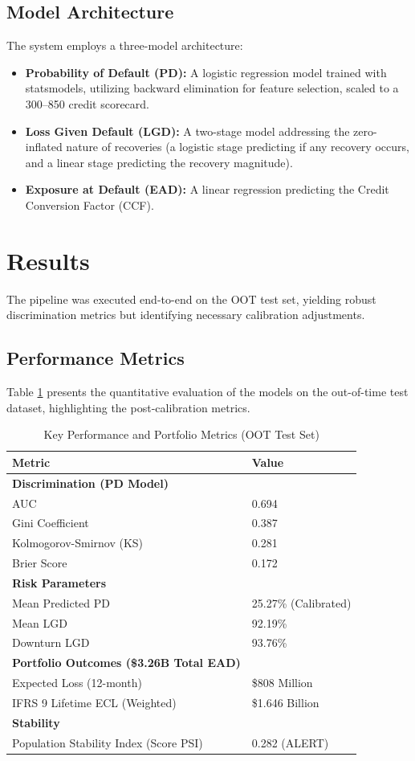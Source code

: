 \documentclass[12pt,a4paper]{article}
\begin{document}
\subsection{Model Architecture}
The system employs a three-model architecture:
\begin{itemize}
    \item \textbf{Probability of Default (PD):} A logistic regression model trained with statsmodels, utilizing backward elimination for feature selection, scaled to a 300--850 credit scorecard.
    \item \textbf{Loss Given Default (LGD):} A two-stage model addressing the zero-inflated nature of recoveries (a logistic stage predicting if any recovery occurs, and a linear stage predicting the recovery magnitude).
    \item \textbf{Exposure at Default (EAD):} A linear regression predicting the Credit Conversion Factor (CCF).
\end{itemize}

\section{Results}
The pipeline was executed end-to-end on the OOT test set, yielding robust discrimination metrics but identifying necessary calibration adjustments. 

\subsection{Performance Metrics}
Table \ref{tab:results} presents the quantitative evaluation of the models on the out-of-time test dataset, highlighting the post-calibration metrics.

\begin{table}[H]
\centering
\caption{Key Performance and Portfolio Metrics (OOT Test Set)}
\label{tab:results}
\begin{tabular}{@{}ll@{}}
\toprule
\textbf{Metric} & \textbf{Value} \\ \midrule
\textbf{Discrimination (PD Model)} & \\
AUC & 0.694 \\
Gini Coefficient & 0.387 \\
Kolmogorov-Smirnov (KS) & 0.281 \\
Brier Score & 0.172 \\ \midrule
\textbf{Risk Parameters} & \\
Mean Predicted PD & 25.27\% (Calibrated) \\
Mean LGD & 92.19\% \\
Downturn LGD & 93.76\% \\ \midrule
\textbf{Portfolio Outcomes (\$3.26B Total EAD)} & \\
Expected Loss (12-month) & \$808 Million \\
IFRS 9 Lifetime ECL (Weighted) & \$1.646 Billion \\ \midrule
\textbf{Stability} & \\
Population Stability Index (Score PSI) & 0.282 (ALERT) \\ \bottomrule
\end{tabular}
\end{table}
\end{document}
